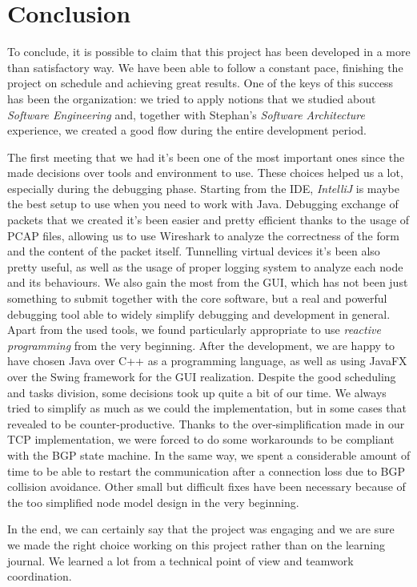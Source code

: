 \chapter{Conclusion}
To conclude, it is possible to claim that this project has been developed in a more than satisfactory way.
We have been able to follow a constant pace, finishing the project on schedule and achieving great results.
One of the keys of this success has been the organization: we tried to apply notions that we studied about \textit{Software Engineering} and, together with Stephan's \textit{Software Architecture} experience, we created a good flow during the entire development period.

The first meeting that we had it's been one of the most important ones since the made decisions over tools and environment to use. These choices helped us a lot, especially during the debugging phase. Starting from the IDE, \textit{IntelliJ} is maybe the best setup to use when you need to work with Java. Debugging exchange of packets that we created it's been easier and pretty efficient thanks to the usage of PCAP files, allowing us to use Wireshark to analyze the correctness of the form and the content of the packet itself.
Tunnelling virtual devices it's been also pretty useful, as well as the usage of proper logging system to analyze each node and its behaviours. We also gain the most from the GUI, which has not been just something to submit together with the core software, but a real and powerful debugging tool able to widely simplify debugging and development in general.
Apart from the used tools, we found particularly appropriate to use \textit{reactive programming} from the very beginning. After the development, we are happy to have chosen Java over C++ as a programming language, as well as using JavaFX over the Swing framework for the GUI realization.
Despite the good scheduling and tasks division, some decisions took up quite a bit of our time. We always tried to simplify as much as we could the implementation, but in some cases that revealed to be counter-productive. Thanks to the over-simplification made in our TCP implementation, we were forced to do some workarounds to be compliant with the BGP state machine. In the same way, we spent a considerable amount of time to be able to restart the communication after a connection loss due to BGP collision avoidance. Other small but difficult fixes have been necessary because of the too simplified node model design in the very beginning.

In the end, we can certainly say that the project was engaging and we are sure we made the right choice working on this project rather than on the learning journal. We learned a lot from a technical point of view and teamwork coordination.
